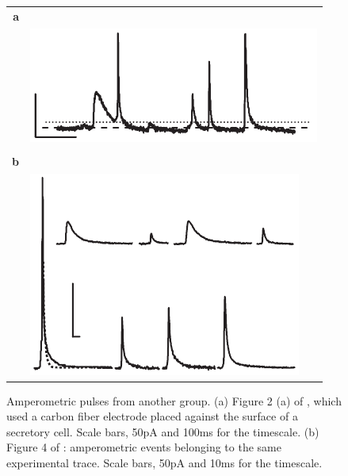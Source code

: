 \begin{figure}
	\centering
	\begin{tabular}{rl}
		\textbf{a} \\ & \includegraphics[width=0.5\linewidth]{figures/mosharok-pulse.png} \\
		\\
		\textbf{b} \\ & \includegraphics[width=0.5\linewidth]{figures/mosharok-pulse-2.png}
	\end{tabular}
	\caption[Amperometric pulses from another group]{Amperometric pulses from another group. (a) Figure 2 (a) of \cite{mosharok2005aee}, which used a carbon fiber electrode placed against the surface of a secretory cell. Scale bars, 50pA and 100ms for the timescale. (b) Figure 4 of \cite{mosharok2005aee}: amperometric events belonging to the same experimental trace. Scale bars, 50pA and 10ms for the timescale.}
	\label{mosharok-pulses}
\end{figure}

